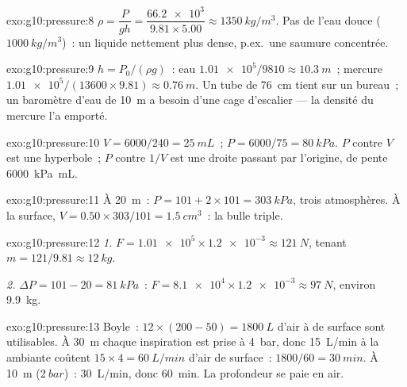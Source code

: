 \begin{solution}{exo:g10:pressure:8}
$\rho = \dfrac{P}{g h} = \dfrac{\num{66.2e3}}{9.81 \times 5.00}
\approx \qty{1350}{kg/m^3}$. Pas de l'eau douce
($\qty{1000}{kg/m^3}$)~: un liquide nettement plus dense, p.ex.\ une
saumure concentrée.
\end{solution}

\begin{solution}{exo:g10:pressure:9}
$h = P_0/(\rho g)$~: eau
$\num{1.01e5}/9810 \approx \qty{10.3}{m}$~; mercure
$\num{1.01e5}/(13600 \times 9.81) \approx \qty{0.76}{m}$. Un tube
de \qty{76}{cm} tient sur un bureau~; un baromètre d'eau de
\qty{10}{m} a besoin d'une cage d'escalier --- la densité du mercure
l'a emporté.
\end{solution}

\begin{solution}{exo:g10:pressure:10}
$V = 6000/240 = \qty{25}{mL}$~; $P = 6000/75 = \qty{80}{kPa}$.
$P$ contre $V$ est une hyperbole~; $P$ contre $1/V$ est une droite
passant par l'origine, de pente \qty{6000}{kPa.mL}.
\end{solution}

\begin{solution}{exo:g10:pressure:11}
À \qty{20}{m}~: $P = 101 + 2 \times 101 = \qty{303}{kPa}$, trois
atmosphères. À la surface,
$V = 0.50 \times 303/101 = \qty{1.5}{cm^3}$~: la bulle triple.
\end{solution}

\begin{solution}{exo:g10:pressure:12}
\emph{1.} $F = \num{1.01e5} \times \num{1.2e-3} \approx \qty{121}{N}$,
tenant $m = 121/9.81 \approx \qty{12}{kg}$.

\emph{2.} $\Delta P = 101 - 20 = \qty{81}{kPa}$~:
$F = \num{8.1e4} \times \num{1.2e-3} \approx \qty{97}{N}$, environ
\qty{9.9}{kg}.
\end{solution}

\begin{solution}{exo:g10:pressure:13}
Boyle~: $12 \times (200 - 50) = \qty{1800}{L}$ d'air à
 de surface sont utilisables. À \qty{30}{m} chaque
inspiration est prise à \qty{4}{bar}, donc \qty{15}{L/min} à la
 ambiante coûtent $15 \times 4 = \qty{60}{L/min}$
d'air de surface~: $1800/60 = \qty{30}{min}$. À \qty{10}{m}
($\qty{2}{bar}$)~: \qty{30}{L/min}, donc \qty{60}{min}. La profondeur
se paie en air.
\end{solution}

